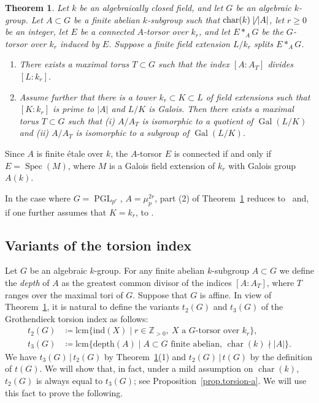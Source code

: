 \documentclass[12pt]{amsart}
\numberwithin{equation}{section}
\newtheorem{theorem}{Theorem}[section]
\theoremstyle{remark}
\newcommand{\Gal}{\operatorname{Gal}}
\newcommand{\PGL}{\operatorname{PGL}}
\newcommand{\Spec}{\operatorname{Spec}}
\newcommand{\Char}{\operatorname{char}}
\begin{document}
\begin{theorem}\label{thm.main}
Let $k$ be an algebraically closed field, and let $G$ be an algebraic $k$-group. Let $A \subset G$ be a finite abelian $k$-subgroup such that $\Char(k) \not\mid |A|$, let $r\geqslant 0$ be an integer, let $E$ be a connected $A$-torsor over $k_r$, and let $E*_AG$ be the $G$-torsor over $k_r$ induced by $E$. Suppose a finite field extension $L/k_r$ splits $E*_AG$. 

 \begin{enumerate}
 \item There exists a maximal torus $T \subset G$ such that the index
 $[A: A_T]$ divides $[L : k_r]$.

 \item Assume further that there is a tower $k_r \subset  K \subset L$ of field extensions such that $[K : k_r]$ is prime to $|A|$ and $L/K$ is Galois. Then there exists a maximal torus $T \subset G$ such that (i) $A/A_T$ is isomorphic to a quotient of $\Gal(L/K)$ and (ii) $A/A_T$ is isomorphic to a subgroup of $\Gal(L/K)$. 
 \end{enumerate}
 \end{theorem}


Since $A$ is finite \'etale over $k$, the $A$-torsor $E$ is connected if and only if $E=\Spec(M)$, where $M$ is a Galois field extension of $k_r$ with Galois group $A(k)$.

In the case where $G = \PGL_{p^r}$, $A = \mu_p^{2r}$, part (2) of Theorem~\ref{thm.main} reduces to~\cite[Proposition 2.1]{genus1} and, if one further assumes that $K = k_r$, to \cite[Theorem 5]{amitsur91}. 

\subsection{Variants of the torsion index}
Let $G$ be an algebraic $k$-group. For any finite abelian $k$-subgroup $A\subset G$ we define the \emph{depth} of $A$ as the greatest common divisor of the indices $[A:A_T]$, where $T$ ranges over the maximal tori of $G$.
Suppose that $G$ is affine. In view of Theorem~\ref{thm.main}, it is natural to define the variants $t_2(G)$ and $t_3(G)$ of the Grothendieck torsion index as follows:
\begin{align}
t_2(G) &\coloneqq \mathrm{lcm}\{\mathrm{ind}(X)\mid r\in \mathbb{Z}_{>0},\ 
X \text{ a } G\text{-torsor over } k_r\}, \label{eq:t2}\\
t_3(G) &\coloneqq \mathrm{lcm}\{\mathrm{depth}(A)\mid
A\subset G \text{ finite abelian, $\Char(k)\nmid |A|$}\}. \label{eq:t3}
\end{align}
We have $t_3(G) \, | \, t_2(G)$ by Theorem~\ref{thm.main}(1) and
$t_2(G) \, | \, t(G)$ by the definition of $t(G)$.
We will show that, in fact, under a mild assumption on $\Char(k)$, $t_2(G)$ is always equal to $t_3(G)$; see Proposition~\ref{prop.torsion-a}. We will use this fact to prove the following.
\end{document}
